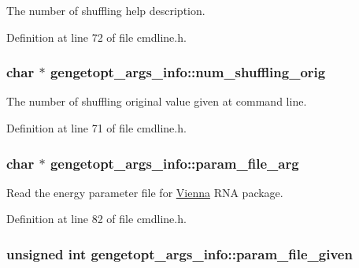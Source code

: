 The number of shuffling help description. 



Definition at line 72 of file cmdline.\+h.

\hypertarget{structgengetopt__args__info_aca977068885436242d4094af483060d7}{
\subsubsection[{num\+\_\+shuffling\+\_\+orig}]{\setlength{\rightskip}{0pt plus 5cm}char $\ast$ gengetopt\+\_\+args\+\_\+info\+::num\+\_\+shuffling\+\_\+orig}}\label{structgengetopt__args__info_aca977068885436242d4094af483060d7}


The number of shuffling original value given at command line. 



Definition at line 71 of file cmdline.\+h.

\hypertarget{structgengetopt__args__info_aa68408ac76065d32115a6517d1dc084f}{
\subsubsection[{param\+\_\+file\+\_\+arg}]{\setlength{\rightskip}{0pt plus 5cm}char $\ast$ gengetopt\+\_\+args\+\_\+info\+::param\+\_\+file\+\_\+arg}}\label{structgengetopt__args__info_aa68408ac76065d32115a6517d1dc084f}


Read the energy parameter file for \hyperlink{namespace_vienna}{Vienna} R\+N\+A package. 



Definition at line 82 of file cmdline.\+h.

\hypertarget{structgengetopt__args__info_acb50657bd03e25460c0fc7b2eda21c3a}{
\subsubsection[{param\+\_\+file\+\_\+given}]{\setlength{\rightskip}{0pt plus 5cm}unsigned int gengetopt\+\_\+args\+\_\+info\+::param\+\_\+file\+\_\+given}}\label{structgengetopt__args__info_acb50657bd03e25460c0fc7b2eda21c3a}


